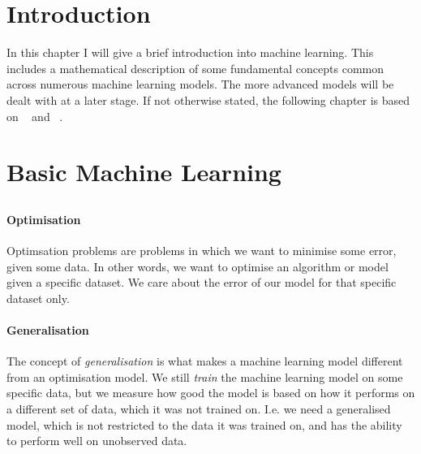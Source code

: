 %
%

\section{Introduction}
In this chapter I will give a brief introduction into machine learning. This includes a mathematical description of some fundamental concepts common across numerous machine learning models. The more advanced models will be dealt with at a later stage. If not otherwise stated, the following chapter is based on ~\cite{Goodfellow-et-al-2016} and ~\cite{hastie2009elements}. 

\section{Basic Machine Learning}

    \subsection{}
        \paragraph{Optimisation}
        Optimsation problems are problems in which we want to minimise some error, given some data. In other words, we want to optimise an algorithm or model given a specific dataset. We care about the error of our model for that specific dataset only.

        \paragraph{Generalisation}
        The concept of \textit{generalisation} is what makes a machine learning model different from an optimisation model. We still \textit{train} the machine learning model on some specific data, but we measure how good the model is based on how it performs on a different set of data, which it was not trained on. I.e. we need a generalised model, which is not restricted to the data it was trained on, and has the ability to perform well on unobserved data. 

    \subsection{}
